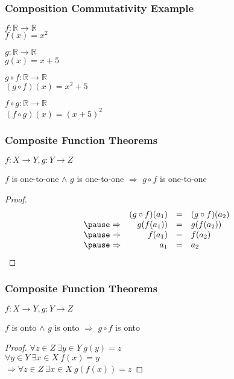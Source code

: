 \documentclass[dvipsnames]{beamer}
\begin{document}
\begin{frame}
  \frametitle{Composition Commutativity Example}

  $f: \mathbb{R} \rightarrow \mathbb{R}$\\
  $f(x) = x^2$

  \medskip
  $g: \mathbb{R} \rightarrow \mathbb{R}$\\
  $g(x) = x + 5$

  \pause
  \bigskip
  $g \circ f: \mathbb{R} \rightarrow \mathbb{R}$\\
  $(g \circ f)(x) = x^2 + 5$

  \pause
  \medskip
  $f \circ g: \mathbb{R} \rightarrow \mathbb{R}$\\
  $(f \circ g)(x) = (x + 5)^2$
\end{frame}

\begin{frame}
  \frametitle{Composite Function Theorems}

  \begin{theorem}
    $f: X \rightarrow Y, g: Y \rightarrow Z$

    $f$ is one-to-one $\wedge$ $g$ is one-to-one
      $\Rightarrow$ $g \circ f$ is one-to-one
  \end{theorem}

  \pause
  \begin{proof}
    \[
      \begin{array}{crcl}
                  & (g \circ f) (a_1) & = & (g \circ f) (a_2)\\\pause
      \Rightarrow & g(f(a_1))         & = & g(f(a_2))\\\pause
      \Rightarrow & f(a_1)            & = & f(a_2)\\\pause
      \Rightarrow & a_1               & = & a_2
      \end{array}
    \]
  \end{proof}
\end{frame}

\begin{frame}
  \frametitle{Composite Function Theorems}

  \begin{theorem}
    $f: X \rightarrow Y, g: Y \rightarrow Z$

    $f$ is onto $\wedge$ $g$ is onto $\Rightarrow$ $g \circ f$ is onto
  \end{theorem}

  \pause
  \begin{proof}
    $\forall z \in Z~\exists y \in Y~g(y) = z$\\\pause
    $\forall y \in Y~\exists x \in X~f(x) = y$\\\pause
      $\Rightarrow \forall z \in Z~\exists x \in X~g(f(x)) = z$
  \end{proof}
\end{frame}
\end{document}
